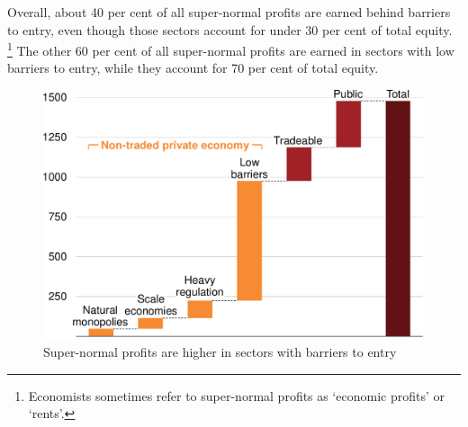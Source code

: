 Overall, about 40 per cent of all super-normal profits are earned behind barriers to entry, even though those sectors account for under 30 per cent of total equity.%
    \footnote{Economists sometimes refer to super-normal profits as `economic profits' or `rents'.}
The other 60 per cent of all super-normal profits are earned in sectors with low barriers to entry, while they account for 70 per cent of total equity. 

\begin{figure}
    \caption{Super-normal profits are higher in sectors with barriers to entry \label{fig:SNP-pc-of-profit}}
  \includegraphics[page=19]{atlas/Charts} 
\end{figure}


